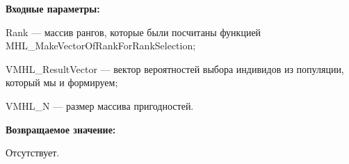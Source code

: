 \textbf{Входные параметры:}  
 
Rank --- массив рангов, которые были посчитаны функцией MHL\_MakeVectorOfRankForRankSelection;
 
VMHL\_ResultVector --- вектор вероятностей выбора индивидов из популяции, который мы и формируем;
 
VMHL\_N --- размер массива пригодностей.

\textbf{Возвращаемое значение:}

 Отсутствует.
